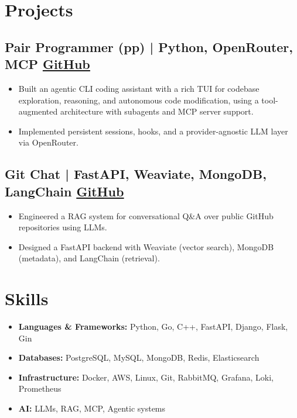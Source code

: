 \documentclass[a4paper,11pt]{article}
\begin{document}
\section*{Projects}
\vspace{-2mm}

\subsection*{Pair Programmer (pp) \textnormal{\small | Python, OpenRouter, MCP} \hfill \href{https://github.com/kanakOS01/pair-programmer}{\underline{\textnormal{GitHub}}}}
\begin{itemize}
    \item Built an agentic CLI coding assistant with a rich TUI for codebase exploration, reasoning, and autonomous code modification, using a tool-augmented architecture with subagents and MCP server support.
    \item Implemented persistent sessions, hooks, and a provider-agnostic LLM layer via OpenRouter.
\end{itemize}
\vspace{-5mm}

\subsection*{Git Chat \textnormal{\small | FastAPI, Weaviate, MongoDB, LangChain} \hfill \href{https://github.com/kanakOS01/gitchat}{\underline{\textnormal{GitHub}}}}
\begin{itemize}
    \item Engineered a RAG system for conversational Q\&A over public GitHub repositories using LLMs.
    \item Designed a FastAPI backend with Weaviate (vector search), MongoDB (metadata), and LangChain (retrieval).
\end{itemize}
\vspace{-5mm}

\section*{Skills}
\vspace{-2mm}
\begin{itemize}[left=0pt]
    \item \textbf{Languages \& Frameworks:} Python, Go, C++, FastAPI, Django, Flask, Gin
    \item \textbf{Databases:} PostgreSQL, MySQL, MongoDB, Redis, Elasticsearch
    \item \textbf{Infrastructure:} Docker, AWS, Linux, Git, RabbitMQ, Grafana, Loki, Prometheus
    \item \textbf{AI:} LLMs, RAG, MCP, Agentic systems
\end{itemize}
\vspace{-5mm}
\end{document}
